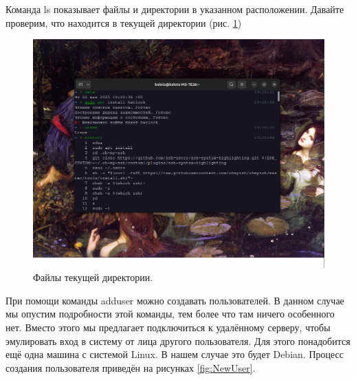 Команда ls показывает файлы и директории в указанном расположении. Давайте проверим, что находится в текущей директории (рис. \ref{fig:ls})

\begin{figure}[h!]
    \centering
    \includegraphics[width=0.8\linewidth]{Pic/lab5/Снимок экрана от 2025-05-22 19-21-05.png}
    \caption{Файлы текущей директории.}
    \label{fig:ls}
\end{figure}

При помощи команды adduser можно создавать пользователей. В данном случае мы опустим подробности этой команды, тем более что там ничего особенного нет. Вместо этого мы предлагает подключиться к удалённому серверу, чтобы эмулировать вход в систему от лица другого пользователя. Для этого понадобится ещё одна машина с системой Linux. В нашем случае это будет Debian. Процесс создания пользователя приведён на рисунках \ref{fig:NewUser}.

